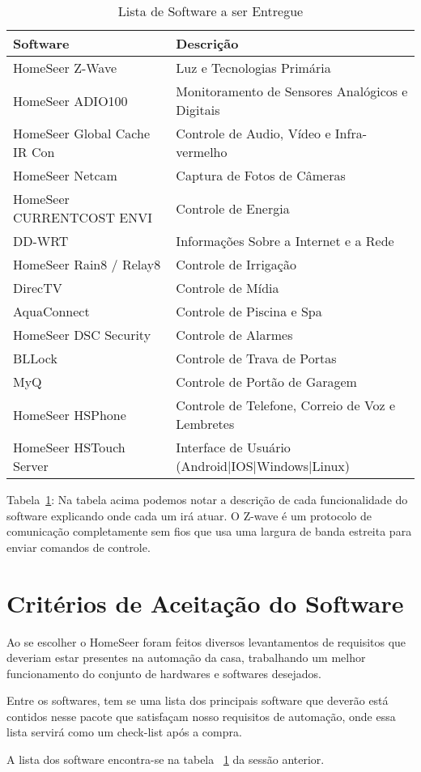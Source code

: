 \begin{table}[H]
\begin{tabular}{|l|l|}
	\hline
	\textbf{Software} & \textbf{Descrição}\tabularnewline
	\hline
	\hline
	HomeSeer Z-Wave & Luz e Tecnologias Primária\tabularnewline
	\hline
	HomeSeer ADIO100 & Monitoramento de Sensores Analógicos e Digitais\tabularnewline
	\hline
	HomeSeer Global Cache IR Con & Controle de Audio, Vídeo e Infra-vermelho\tabularnewline
	\hline
	HomeSeer Netcam & Captura de Fotos de Câmeras\tabularnewline
	\hline
	HomeSeer CURRENTCOST ENVI & Controle de Energia\tabularnewline
	\hline
	DD-WRT & Informações Sobre a Internet e a Rede\tabularnewline
	\hline
	HomeSeer Rain8 / Relay8 & Controle de Irrigação\tabularnewline
	\hline
	DirecTV & Controle de Mídia\tabularnewline
	\hline
	AquaConnect & Controle de Piscina e Spa\tabularnewline
	\hline
	HomeSeer DSC Security & Controle de Alarmes\tabularnewline
	\hline
	BLLock & Controle de Trava de Portas\tabularnewline
	\hline
	MyQ & Controle de Portão de Garagem\tabularnewline
	\hline
	HomeSeer HSPhone & Controle de Telefone, Correio de Voz e Lembretes\tabularnewline
	\hline
	HomeSeer HSTouch Server & Interface de Usuário (Android|IOS|Windows|Linux)\tabularnewline
	\hline
\end{tabular}
\caption{Lista de Software a ser Entregue}
\label{Lista_de_Software_a_ser_Entregue}
\end{table}

Tabela~\ref{Lista_de_Software_a_ser_Entregue}:  Na tabela acima podemos notar a descrição de cada funcionalidade do software explicando onde cada um irá atuar. O Z-wave é um protocolo de comunicação completamente sem fios que usa uma largura de banda estreita para enviar comandos de controle.


\section{Critérios de Aceitação do Software}
Ao se escolher o HomeSeer foram feitos diversos levantamentos de requisitos que deveriam estar presentes na automação da casa, trabalhando um melhor funcionamento do conjunto de hardwares e softwares desejados. 

Entre os softwares, tem se uma lista dos principais software que deverão está contidos nesse pacote que satisfaçam nosso requisitos de automação, onde essa lista servirá como um check-list após a compra.

A lista dos software encontra-se na tabela ~\ref{Lista_de_Software_a_ser_Entregue} da sessão anterior.